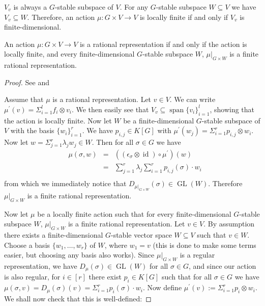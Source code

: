 \begin{remark}
  $V_v$ is always a $G$-stable subspace of $V$.
  For any $G$-stable subspace $W \subseteq V$ we have $V_v \subseteq W$.
  Therefore, an action $\mu \colon G \times V \longrightarrow V$ is locally finite if and only if $V_v$ is finite-dimensional.
\end{remark}

\begin{proposition}\label{locfin}
  An action $\mu \colon G \times V \longrightarrow V$ is a rational representation if and only if the action is locally finite, and every finite-dimensional $G$-stable subspace $W$, $\left. \mu \right|_{G\times W}$ is a finite rational representation.
\end{proposition}

\begin{proof}
  See \cite[A.1.8]{DK15} and \cite[2.2.5(b)$\implies$(c), 2.2.6]{DK15}

  Assume that $\mu$ is a rational representation.
  Let $v \in V$.
  We can write $\mu^\prime (v) = \Sigma_{i=1}^l f_i \otimes v_i$. %
  We then easily see that $V_v \subseteq \operatorname{span}\{v_i\}_{i=1}^l$, showing that the action is locally finite.
  Now let $W$ be a finite-dimensional $G$-stable subspace of $V$ with the basis $\{w_i\}_{i=1}^r$.
  We have $p_{i,j} \in K[G]$ with $ \mu^\prime (w_j) = \Sigma_{i=1}^r p_{i,j} \otimes w_i$.
  Now let $w = \Sigma_{j=1}^r \lambda_j w_j \in W$.
  Then for all $\sigma \in G$ we have
  \begin{equation}
    \begin{aligned}
      &\mu (\sigma,w)
      &=& \left(\left(\epsilon_\sigma \otimes \operatorname{id} \right) \circ \mu^\prime \right) \left(w \right) \\
      &&=& \sum_{j=1}^r \lambda_j  \sum_{i=1}^r p_{i,j}\left(\sigma\right) \cdot w_i \\
    \end{aligned}
  \end{equation}
  from which we immediately notice that $D_{\left. \mu \right|_{G \times W}} (\sigma) \in \operatorname{GL}(W)$.
  Therefore $\left. \mu \right|_{G\times W}$ is a finite rational representation.

  Now let $\mu$ be a locally finite action such that for every finite-dimensional $G$-stable subspace $W$, $\left. \mu \right|_{G\times W}$ is a finite rational representation.
  Let $v \in V$.
  By assumption there exists a finite-dimensional $G$-stable vector space $W \subseteq V$ such that $v \in W$.
  Choose a basis $\{w_1, \ldots, w_r\}$ of $W$, where $w_1 = v$ (this is done to make some terms easier, but choosing any basis also works).
  Since $\left. \mu \right|_{G\times W}$ is a regular representation, we have $D_\mu (\sigma) \in \operatorname{GL}(W)$ for all $\sigma \in G$, and since our action is also regular, for $i \in [r]$ there exist $p_i \in K[G]$ such that for all $\sigma \in G$ we have $\mu(\sigma, v) = D_\mu(\sigma)(v) = \Sigma_{i=1}^r p_i(\sigma) \cdot w_i$.
  Now define $\mu^\prime (v) := \Sigma_{i=1}^r p_i \otimes w_i$.
  We shall now check that this is well-defined:
  

\end{proof}
